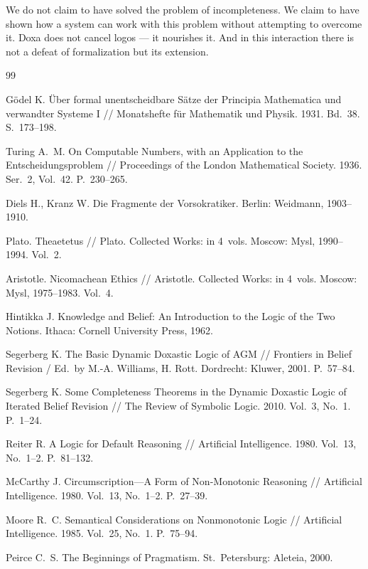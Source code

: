 \documentclass[12pt,a4paper]{article}
\begin{document}
We do not claim to have solved the problem of incompleteness. We claim to have
shown how a system can work with this problem without attempting to overcome
it. Doxa does not cancel logos --- it nourishes it. And in this interaction
there is not a defeat of formalization but its extension.

\begin{thebibliography}{99}

	 G\"odel K. \"Uber formal unentscheidbare S\"atze der Principia Mathematica und verwandter Systeme I // Monatshefte f\"ur Mathematik und Physik. 1931. Bd.~38. S.~173--198.

	 Turing A.~M. On Computable Numbers, with an Application to the Entscheidungsproblem // Proceedings of the London Mathematical Society. 1936. Ser.~2, Vol.~42. P.~230--265.

	 Diels H., Kranz W. Die Fragmente der Vorsokratiker. Berlin: Weidmann, 1903--1910.

	 Plato. Theaetetus // Plato. Collected Works: in 4~vols. Moscow: Mysl, 1990--1994. Vol.~2.

	 Aristotle. Nicomachean Ethics // Aristotle. Collected Works: in 4~vols. Moscow: Mysl, 1975--1983. Vol.~4.

	 Hintikka J. Knowledge and Belief: An Introduction to the Logic of the Two Notions. Ithaca: Cornell University Press, 1962.

	 Segerberg K. The Basic Dynamic Doxastic Logic of AGM // Frontiers in Belief Revision / Ed.~by M.-A. Williams, H. Rott. Dordrecht: Kluwer, 2001. P.~57--84.

	 Segerberg K. Some Completeness Theorems in the Dynamic Doxastic Logic of Iterated Belief Revision // The Review of Symbolic Logic. 2010. Vol.~3, No.~1. P.~1--24.

	 Reiter R. A Logic for Default Reasoning // Artificial Intelligence. 1980. Vol.~13, No.~1--2. P.~81--132.

	 McCarthy J. Circumscription---A Form of Non-Monotonic Reasoning // Artificial Intelligence. 1980. Vol.~13, No.~1--2. P.~27--39.

	 Moore R.~C. Semantical Considerations on Nonmonotonic Logic // Artificial Intelligence. 1985. Vol.~25, No.~1. P.~75--94.

	 Peirce C.~S. The Beginnings of Pragmatism. St.~Petersburg: Aleteia, 2000.


\end{thebibliography}
\end{document}
